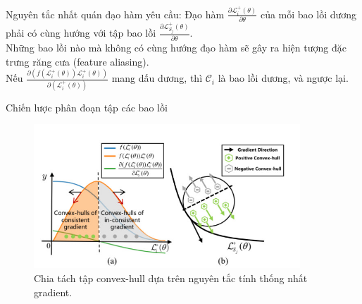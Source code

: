 \documentclass[11pt]{beamer}
\theoremstyle{definition}
\theoremstyle{plain}
\theoremstyle{plain}
\theoremstyle{remark}
\begin{document}
	\begin{frame}
		Nguyên tắc nhất quán đạo hàm yêu cầu: Đạo hàm $\frac{\partial \mathcal{L}_i^{+}(\theta)}{\partial \theta}$ của mỗi bao lồi dương phải có cùng hướng với tập bao lồi 
		$\frac{\partial \mathcal{L}_{S_j}^{+}(\theta)}{\partial \theta}$.\\
		Những bao lồi nào mà không có cùng hướng đạo hàm sẽ gây ra hiện tượng đặc trưng răng cưa (feature aliasing). \\
		
		Nếu $\frac{\partial\left(f\left(\mathcal{L}_i^{+}(\theta)\right) \mathcal{L}_i^{+}(\theta)\right)}{\partial\left(\mathcal{L}_i^{+}(\theta)\right)}$ mang dấu dương, thì $\mathcal{C}_i$ là bao lồi dương, và ngược lại.
	\end{frame}
	
	\begin{frame}{Chiến lược phân đoạn tập các bao lồi}
		
		\begin{figure}[ht!]
			\begin{center}
				\includegraphics[width=10cm]{./Hinh_9.jpg}
				\caption{Chia tách tập convex-hull dựa trên nguyên tắc tính thống nhất gradient.}
				\label{upper_convex_function}
			\end{center}
		\end{figure}
		
	\end{frame}
	
\end{document}
